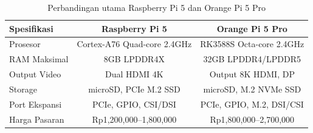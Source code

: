 \begin{table}[ht]
\centering
\begin{tabular}{|l|c|c|}
\hline
\textbf{Spesifikasi} & \textbf{Raspberry Pi 5} & \textbf{Orange Pi 5 Pro} \\
\hline
Prosesor & Cortex-A76 Quad-core 2.4GHz & RK3588S Octa-core 2.4GHz\\
RAM Maksimal & 8GB LPDDR4X & 32GB LPDDR4/LPDDR5 \\
Output Video & Dual HDMI 4K & Output 8K HDMI, DP \\
Storage & microSD, PCIe M.2 SSD & microSD, M.2 NVMe SSD \\
Port Ekspansi & PCIe, GPIO, CSI/DSI & PCIe, GPIO, M.2, DSI/CSI \\
Harga Pasaran & Rp1,200,000–1,800,000 & Rp1,800,000–2,700,000 \\
\hline
\end{tabular}
\caption{Perbandingan utama Raspberry Pi 5 dan Orange Pi 5 Pro}
\label{tab:pi5-opi5pro}
\end{table}